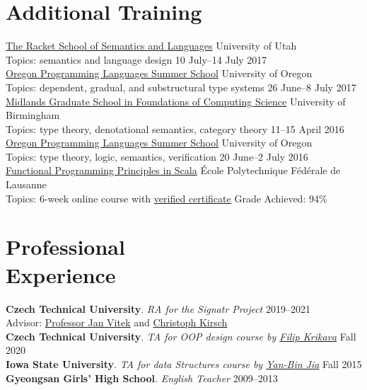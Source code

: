\documentclass[margin,line]{resume}
\begin{document}
\begin{resume}
      

\section{\mysidestyle Additional Training}

\newcommand\ssitem[5]{\href{#1}{#2} \hfill #3 \\ Topics: #4 \hfill #5}

\ssitem
{https://summer-school.racket-lang.org/2017/}
{The Racket School of Semantics and Languages}
{University of Utah}
{semantics and language design}
{10 July--14 July 2017}\\[\mymedskip]
\ssitem
{https://www.cs.uoregon.edu/research/summerschool/summer17}
{Oregon Programming Languages Summer School}
{University of Oregon}
{dependent, gradual, and substructural type systems}
{26 June--8 July 2017}\\[\mymedskip]
\ssitem
{http://www.cs.bham.ac.uk/~pbl/mgs2016/}
{Midlands Graduate School in Foundations of Computing Science}
{University of Birmingham}
{type theory, denotational semantics, category theory}
{11--15 April 2016}\\[\mymedskip]
\ssitem
{https://www.cs.uoregon.edu/research/summerschool/summer16/}
{Oregon Programming Languages Summer School}
{University of Oregon}
{type theory, logic, semantics, verification}
{20 June--2 July 2016}\\[\mymedskip]
\ssitem
{https://www.coursera.org/learn/progfun1}
{Functional Programming Principles in Scala}
{\'{E}cole Polytechnique F\'{e}d\'{e}rale de Lausanne}
{6-week online course with
\href{https://www.coursera.org/account/accomplishments/records/SRLRBNFMFW86}
     {verified certificate}}
{Grade Achieved: 94\%}

\section{\mysidestyle Professional\\Experience}
\textbf{Czech Technical University}.  \textsl{RA for the Signatr Project} \hfill 2019--2021\\
Advisor: \href{http://janvitek.org/}{Professor Jan Vitek} and \href{http://cs.uni-salzburg.at/~ck/}{Christoph Kirsch}\\[\mysmallskip]
\textbf{Czech Technical University}.  \textsl{TA for OOP design course by \href{https://fikovnik.net/}{Filip Krikava}} \hfill Fall 2020\\
\textbf{Iowa State University}.  \textsl{TA for data Structures course by \href{http://web.cs.iastate.edu/~jia/}{Yan-Bin Jia}} \hfill Fall 2015\\[\mysmallskip]
\textbf{Gyeongsan Girls' High School}. \textsl{English Teacher}  \hfill 2009--2013


\end{resume}
\end{document}

